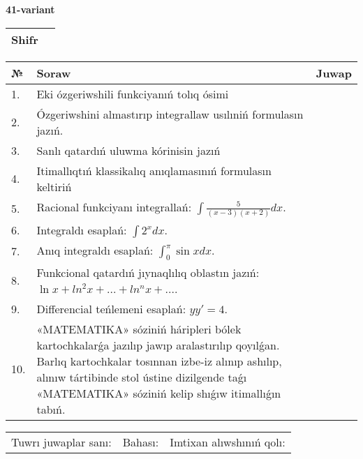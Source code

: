 \documentclass{article}
\begin{document}
  \egroup
  
  \newpage
  
  
  \textbf{41-variant}\\
  
  \bgroup
  \def\arraystretch{1.6} %
  
  \begin{tabular}{|m{5.7cm}|m{9.5cm}|}
  \hline
  Shifr & \\
  \hline
  \end{tabular}
  
  \vspace{1cm}
  
  \begin{tabular}{|m{0.7cm}|m{10cm}|m{4cm}|}
  \hline
  № & Soraw & Juwap \\
  \hline
  1. & Eki ózgeriwshili funkciyanıń tolıq ósimi &  \\
  \hline
  2. & Ózgeriwshini almastırıp integrallaw usılıniń formulasın jazıń. &  \\
  \hline
  3. & Sanlı qatardıń uluwma kórinisin jazıń &  \\
  \hline
  4. & Itimallıqtıń klassikalıq anıqlamasınıń formulasın keltiriń &  \\
  \hline
  5. & Racional funkciyanı integrallań: \(\int{\frac{5}{(x - 3)(x + 2)}dx}\). &  \\
  \hline
  6. & Integraldı esaplań: \(\int{2^{x}dx}\). &  \\
  \hline
  7. & Anıq integraldı esaplań: \(\int_{0}^{\pi}{\sin xdx}\). &  \\
  \hline
  8. & Funkcional qatardıń jıynaqlılıq oblastın jazıń: \(\ln x + ln^2 x + ... + ln^{n}x + ...\). &  \\
  \hline
  9. & Differencial teńlemeni esaplań: \(yy' = 4\). &  \\
  \hline
  10. & «MATEMATIKA» sóziniń háripleri bólek kartochkalarǵa jazılıp jawıp aralastırılıp qoyılǵan. Barlıq kartochkalar tosınnan izbe-iz alınıp ashılıp, alınıw tártibinde stol ústine dizilgende taǵı «MATEMATIKA» sóziniń kelip shıǵıw itimallıǵın tabıń. &  \\
  \hline
  \end{tabular}
  
  \vspace{1cm}
  
  \begin{tabular}{lll}
  Tuwrı juwaplar sanı: \underline{\hspace{1.5cm}} & 
  Bahası: \underline{\hspace{1.5cm}} & 
  Imtixan alıwshınıń qolı: \underline{\hspace{2cm}} \\
  \end{tabular}
  
\end{document}

